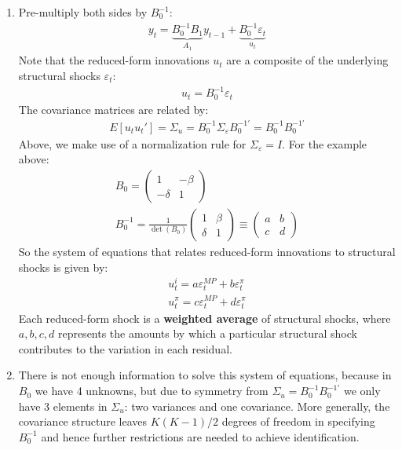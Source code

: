 \begin{enumerate}
\item Pre-multiply both sides by \(B_0^{-1}\):
\begin{align*}
y_t = \underbrace{B_0^{-1} B_1}_{A_1} y_{t-1} + \underbrace{B_0^{-1} \varepsilon_t}_{u_t}
\end{align*}
Note that the reduced-form innovations \(u_t\) are a composite of the underlying structural shocks \(\varepsilon_t\):
\begin{align*}
u_t = B_0^{-1} \varepsilon_t
\end{align*}
The covariance matrices are related by:
\begin{align*}
E[u_t u_t'] = \Sigma_u = B_0^{-1} \Sigma_\varepsilon B_0^{-1'} = B_0^{-1} B_0^{-1'}
\end{align*}
Above, we make use of a normalization rule for \(\Sigma_\varepsilon=I\).
For the example above:
\begin{align*}
B_0 = \begin{pmatrix} 1 & -\beta \\ -\delta & 1 \end{pmatrix}
\\
B_0^{-1} = \frac{1}{\det(B_0)} \begin{pmatrix} 1 & \beta \\ \delta & 1 \end{pmatrix} \equiv \begin{pmatrix} a & b \\ c & d \end{pmatrix}
\end{align*}
So the system of equations that relates reduced-form innovations to structural shocks is given by:
\begin{align*}
u_t^{i} = a \varepsilon_t^{MP} + b \varepsilon_t^{\pi}
\\
u_t^{\pi} = c \varepsilon_t^{MP} + d \varepsilon_t^{\pi}
\end{align*}
Each reduced-form shock is a \textbf{weighted average} of structural shocks,
where \(a,b,c,d\) represents the amounts by which a particular structural shock contributes to the variation in each residual.

\item There is not enough information to solve this system of equations, because in \(B_0\) we have 4 unknowns,
but due to symmetry from \(\Sigma_u = B_0^{-1} B_0^{-1'}\) we only have 3 elements in \(\Sigma_u\): two variances and one covariance.
More generally, the covariance structure leaves \(K(K-1)/2\) degrees of freedom in specifying \(B_0^{-1}\)
and hence further restrictions are needed to achieve identification.


\end{enumerate}
